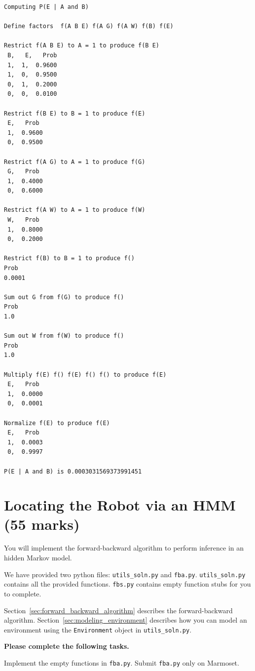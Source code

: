 \documentclass[12pt]{article}
\begin{document}
\begin{verbatim}
Computing P(E | A and B)

Define factors  f(A B E) f(A G) f(A W) f(B) f(E)

Restrict f(A B E) to A = 1 to produce f(B E)
 B,   E,   Prob
 1,  1,  0.9600
 1,  0,  0.9500
 0,  1,  0.2000
 0,  0,  0.0100

Restrict f(B E) to B = 1 to produce f(E)
 E,   Prob
 1,  0.9600
 0,  0.9500

Restrict f(A G) to A = 1 to produce f(G)
 G,   Prob
 1,  0.4000
 0,  0.6000

Restrict f(A W) to A = 1 to produce f(W)
 W,   Prob
 1,  0.8000
 0,  0.2000

Restrict f(B) to B = 1 to produce f()
Prob
0.0001

Sum out G from f(G) to produce f()
Prob
1.0

Sum out W from f(W) to produce f()
Prob
1.0

Multiply f(E) f() f(E) f() f() to produce f(E)
 E,   Prob
 1,  0.0000
 0,  0.0001

Normalize f(E) to produce f(E)
 E,   Prob
 1,  0.0003
 0,  0.9997

P(E | A and B) is 0.0003031569373991451
\end{verbatim}



\newpage
\section{Locating the Robot via an HMM (55 marks)}

You will implement the forward-backward algorithm to perform inference in an hidden Markov model. 

We have provided two python files: \verb+utils_soln.py+ and \verb+fba.py+.  \verb+utils_soln.py+ contains all the provided functions. \verb+fbs.py+ contains empty function stubs for you to complete.

Section~\ref{sec:forward_backward_algorithm} describes the forward-backward algorithm. Section~\ref{sec:modeling_environment} describes how you can model an environment using the \verb+Environment+ object in \verb+utils_soln.py+. 


{\bf Please complete the following tasks.}

Implement the empty functions in \verb+fba.py+. Submit \verb+fba.py+ only on Marmoset.
    
\end{document}
